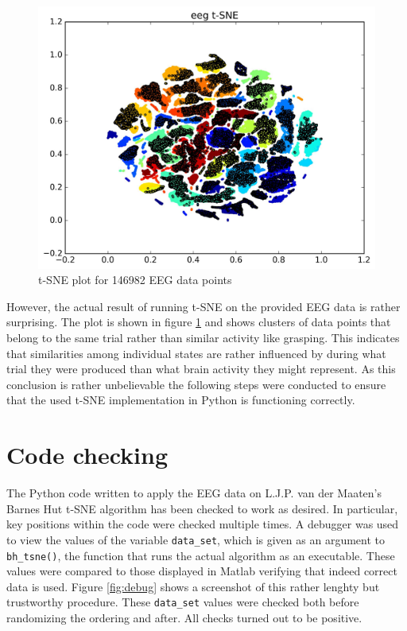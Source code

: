 \documentclass{article} %
\begin{document}
\begin{figure}[h]
	\centering
	\includegraphics[width=1.0\textwidth]{eeg.jpg}
	\caption{t-SNE plot for 146982 EEG data points}
	\label{fig:eeg}
\end{figure}

However, the actual result of running t-SNE on the provided EEG data is rather surprising. The plot is shown in figure \ref{fig:eeg} and shows clusters of data points that belong to the same trial rather than similar activity like grasping. This indicates that similarities among individual states are rather influenced by during what trial they were produced than what brain activity they might represent.
As this conclusion is rather unbelievable the following steps were conducted to ensure that the used t-SNE implementation in Python is functioning correctly.




\section{Code checking}
The Python code written to apply the EEG data on L.J.P. van der Maaten's Barnes Hut t-SNE algorithm has been checked to work as desired. In particular, key positions within the code were checked multiple times. A debugger was used to view the values of the variable \verb|data_set|, which is given as an argument to \verb|bh_tsne()|, the function that runs the actual algorithm as an executable. These values were compared to those displayed in Matlab verifying that indeed correct data is used. Figure \ref{fig:debug} shows a screenshot of this rather lenghty but trustworthy procedure. These \verb|data_set| values were checked both before randomizing the ordering and after. All checks turned out to be positive.
\end{document}

